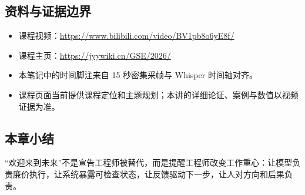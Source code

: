 \documentclass[a4paper,11pt]{article}
\begin{document}
\subsection{资料与证据边界}

\begin{itemize}
  \item 课程视频：\url{https://www.bilibili.com/video/BV1pb8o6yE8f/}
  \item 课程主页：\url{https://jyywiki.cn/GSE/2026/}
  \item 本笔记中的时间脚注来自 15 秒密集采帧与 Whisper 时间轴对齐。
  \item 课程页面当前提供课程定位和主题规划；本讲的详细论证、案例与数值以视频证据为准。
\end{itemize}

\subsection{本章小结}

“欢迎来到未来”不是宣告工程师被替代，而是提醒工程师改变工作重心：让模型负责廉价执行，让系统暴露可检查状态，让反馈驱动下一步，让人对方向和后果负责。
\end{document}
